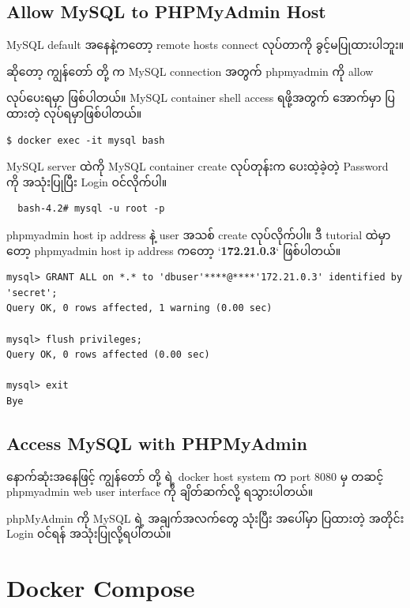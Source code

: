 \documentclass{article}
\begin{document}
\subsection{Allow MySQL to PHPMyAdmin
Host}\label{allow-mysql-to-phpmyadmin-host}

MySQL default အနေနဲ့ကတော့ remote hosts connect လုပ်တာကို
ခွင့်မပြုထားပါဘူး။

ဆိုတော့ ကျွန်တော် တို့ က MySQL connection အတွက် phpmyadmin ကို allow

လုပ်ပေးရမှာ ဖြစ်ပါတယ်။ MySQL container shell access ရဖို့အတွက် အောက်မှာ
ပြထားတဲ့ လုပ်ရမှာဖြစ်ပါတယ်။

\begin{verbatim}
$ docker exec -it mysql bash
\end{verbatim}

MySQL server ထဲကို MySQL container create လုပ်တုန်းက ပေးထဲ့ခဲ့တဲ့
Password ကို အသုံးပြုပြီး Login ဝင်လိုက်ပါ။

\begin{verbatim}
  bash-4.2# mysql -u root -p
\end{verbatim}

phpmyadmin host ip address နဲ့ user အသစ် create လုပ်လိုက်ပါ။ ဒီ tutorial
ထဲမှာတော့ phpmyadmin host ip address ကတော့ `\textbf{172.21.0.3}`
ဖြစ်ပါတယ်။

\begin{verbatim}
mysql> GRANT ALL on *.* to 'dbuser'****@****'172.21.0.3' identified by 'secret';
Query OK, 0 rows affected, 1 warning (0.00 sec)

mysql> flush privileges;
Query OK, 0 rows affected (0.00 sec)

mysql> exit
Bye
\end{verbatim}

\subsection{Access MySQL with
PHPMyAdmin}\label{access-mysql-with-phpmyadmin}

နောက်ဆုံးအနေဖြင့် ကျွန်တော် တို့ ရဲ့ docker host system က port 8080 မှ
တဆင့် phpmyadmin web user interface ကို ချိတ်ဆက်လို့ ရသွားပါတယ်။

phpMyAdmin ကို MySQL ရဲ့ အချက်အလက်တွေ သုံးပြီး အပေါ်မှာ ပြထားတဲ့ အတိုင်း
Login ဝင်ရန် အသုံးပြုလို့ရပါတယ်။

\section{Docker Compose}\label{docker-compose}
\end{document}
